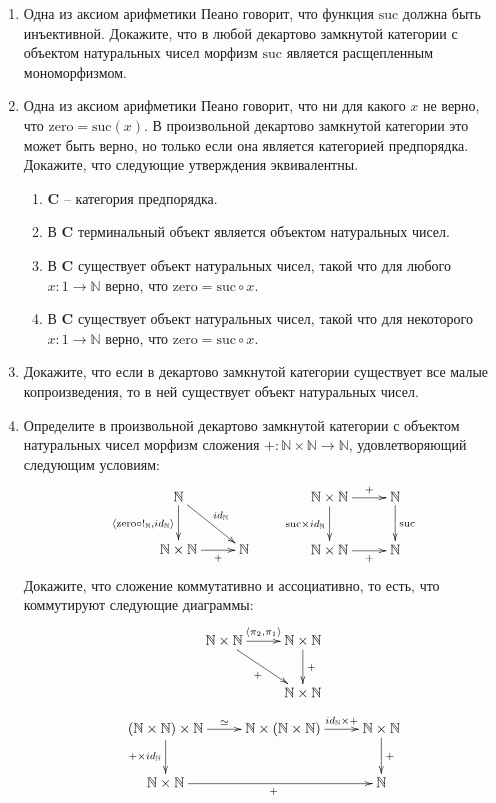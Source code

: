 \documentclass[draft]{article}
\newcommand{\cat}[1]{\mathbf{#1}}
\renewcommand{\C}{\cat{C}}
\newcommand{\zero}{\mathrm{zero}}
\newcommand{\suc}{\mathrm{suc}}
\begin{document}
\begin{enumerate}
\item Одна из аксиом арифметики Пеано говорит, что функция $\suc$ должна быть инъективной.
Докажите, что в любой декартово замкнутой категории с объектом натуральных чисел морфизм $\suc$ является расщепленным мономорфизмом.

\item Одна из аксиом арифметики Пеано говорит, что ни для какого $x$ не верно, что $\zero = \suc(x)$.
В произвольной декартово замкнутой категории это может быть верно, но только если она является категорией предпорядка.
Докажите, что следующие утверждения эквивалентны.
\begin{enumerate}
\item $\C$ -- категория предпорядка.\\

\item В $\C$ терминальный объект является объектом натуральных чисел.
\item В $\C$ существует объект натуральных чисел, такой что для любого $x : 1 \to \mathbb{N}$ верно, что $\zero = \suc \circ x$.
\item В $\C$ существует объект натуральных чисел, такой что для некоторого $x : 1 \to \mathbb{N}$ верно, что $\zero = \suc \circ x$.
\end{enumerate}

\item Докажите, что если в декартово замкнутой категории существует все малые копроизведения, то в ней существует объект натуральных чисел.

\item Определите в произвольной декартово замкнутой категории с объектом натуральных чисел морфизм сложения $+ : \mathbb{N} \times \mathbb{N} \to \mathbb{N}$, удовлетворяющий следующим условиям:
\[ \xymatrix{ \mathbb{N} \ar[d]_{\langle \zero \circ !_\mathbb{N}, id_\mathbb{N} \rangle} \ar[rd]^{id_\mathbb{N}} \\
              \mathbb{N} \times \mathbb{N} \ar[r]_-{+} & \mathbb{N}
            }
\qquad
   \xymatrix{ \mathbb{N} \times \mathbb{N} \ar[r]^-{+} \ar[d]_{\suc \times id_\mathbb{N}} & \mathbb{N} \ar[d]^{\suc} \\
              \mathbb{N} \times \mathbb{N} \ar[r]_-{+} & \mathbb{N}
            } \]
Докажите, что сложение коммутативно и ассоциативно, то есть, что коммутируют следующие диаграммы:
\[ \xymatrix{ \mathbb{N} \times \mathbb{N} \ar[r]^{\langle \pi_2, \pi_1 \rangle} \ar[rd]_{+} & \mathbb{N} \times \mathbb{N} \ar[d]^{+} \\
                                                                           & \mathbb{N} \times \mathbb{N}
            } \]
\[ \xymatrix{ (\mathbb{N} \times \mathbb{N}) \times \mathbb{N} \ar[r]^{\simeq} \ar[d]_{+ \times id_\mathbb{N}} & \mathbb{N} \times (\mathbb{N} \times \mathbb{N}) \ar[r]^-{id_\mathbb{N} \times +} & \mathbb{N} \times \mathbb{N} \ar[d]^{+} \\
              \mathbb{N} \times \mathbb{N} \ar[rr]_{+} & & \mathbb{N}
            } \]

\end{enumerate}
\end{document}

